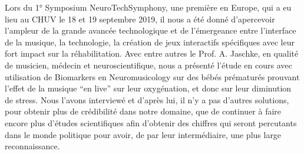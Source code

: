 Lors du 1° Symposium
 NeuroTechSymphony, une première en Europe, qui a eu lieu au CHUV le 18 et 19 septembre 2019, il 
 nous a été
 donné d'apercevoir l'ampleur de la grande avancée technologique
 et de l'émergeance entre l'interface de la musique, la technologie, la
 création de jeux interactifs spécifiques avec leur fort impact sur la
 réhabilitation. Avec entre autres le Prof. A. Jaschke, en qualité de musicien, médecin et 
 neuroscientifique, nous a  présenté l'étude en cours avec utilisation de
Biomarkers en Neuromusicology sur des
bébés prématurés prouvant l'effet de la musique ``en live'' sur leur
oxygénation, et donc sur leur diminution de stress. Nous l'avons interviewé et d'après lui, il n'y a pas 
d'autres solutions, pour obtenir plus de crédibilité dans notre domaine, que de continuer à faire encore 
plus d'études scientifiques afin d'obtenir des chiffres qui seront percutants dans le monde politique pour 
avoir, de par leur intermédiaire, une plus large reconnaissance.


